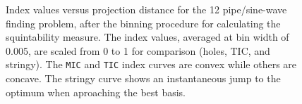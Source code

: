 \documentclass[
  number,
  preprint,
  3p]{elsarticle}
\begin{document}
\begin{figure}


\caption{\label{fig-idx-proj-dist}Index values versus projection
distance for the 12 pipe/sine-wave finding problem, after the binning
procedure for calculating the squintability measure. The index values,
averaged at bin width of 0.005, are scaled from 0 to 1 for comparison
(holes, TIC, and stringy). The \texttt{MIC} and \texttt{TIC} index
curves are convex while others are concave. The stringy curve shows an
instantaneous jump to the optimum when aproaching the best basis.}

\end{figure}%
\end{document}
